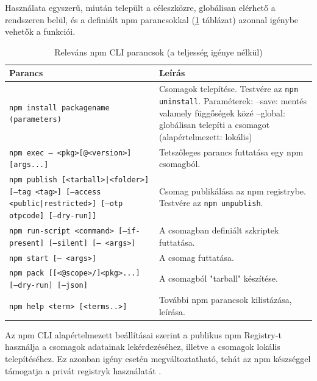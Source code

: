 Használata egyszerű, miután települt a céleszközre, globálisan elérhető a rendszeren belül, és a definiált npm parancsokkal (\ref{tab:npm-cli} táblázat) azonnal igénybe vehetők a funkciói.
\begin{table}[h]
	\caption{Releváns npm CLI parancsok (a teljesség igénye nélkül)}
	\label{tab:npm-cli}
	\begin{tabularx}{\textwidth} { 
			| >{\centering\arraybackslash}X 
			| >{\centering\arraybackslash}X |}
		\hline
		\textbf{Parancs} & \textbf{Leírás} \\
		\hline
		\texttt{npm install packagename (parameters)} & Csomagok telepítése. Testvére az \texttt{npm uninstall}. Paraméterek: 
		\newline--save: mentés valamely függőségek közé
		\newline--global: globálisan telepíti a csomagot (alapértelmezett: lokális)
		\\
		\hline
		\texttt{npm exec -- <pkg>[@<version>] [args...]} & Tetszőleges parancs futtatása egy npm csomagból.
		\\
		\hline
		\texttt{npm publish [<tarball>|<folder>] [--tag <tag>] [--access <public|restricted>] [--otp otpcode] [--dry-run]]} & Csomag publikálása az npm registrybe. Testvére az \texttt{npm unpublish}.
		\\
		\hline
		\texttt{npm run-script <command> [--if-present] [--silent] [-- <args>]} & A csomagban definiált szkriptek futtatása.
		\\
		\hline
		\texttt{npm start [-- <args>]} & A csomag futtatása.
		\\
		\hline
		\texttt{npm pack [[<@scope>/]<pkg>...] [--dry-run] [--json]} & A csomagból "tarball" készítése.
		\\
		\hline
		\texttt{npm help <term> [<terms..>]} & További npm parancsok kilistázása, leírása.
		\\
		\hline
	\end{tabularx}
\end{table}

Az npm CLI alapértelmezett beállításai szerint a publikus npm Registry-t használja a csomagok adatainak lekérdezéséhez, illetve a csomagok lokális telepítéséhez. Ez azonban igény esetén megváltoztatható, tehát az npm készséggel támogatja a privát registryk használatát \cite{npm-cli}.
